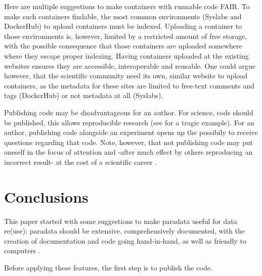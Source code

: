 
Here are multiple suggestions to make containers with runnable code FAIR.
To make such containers findable, the most common 
environments (Syslabs and DockerHub) to upload containers must be indexed.
Uploading a container to those environments is, however, limited by
a restricted amount of free storage, with the possible consequence that
those containers are uploaded somewhere where they escape proper indexing.
Having containers uploaded at the existing websites ensures they are
accessible, interoperable and reusable.
One could argue however, that the scientific community need its own,
similar website to upload containers, as the metadata for these
sites are limited to free-text comments and tags (DockerHub)
or not metadata at all (Syslabs).


Publishing code may be disadvantageous for an author.
For science, code should be published, 
this allows reproducible research 
(see \cite{haibe2020importance} for a tragic example).
For an author, publishing code alongside an experiment opens up
the possibily to receive questions regarding that code.
Note, however, that not publishing code may put 
oneself in the focus of attention
and -after much effect by others reproducing an incorrect result-
at the cost of a scientific career \cite{baggerly2009deriving}.

\section{Conclusions}

This paper started with some suggestions to 
make paradata useful for data re(use):
paradata should be extensive, comprehensively documented,
with the creation of documentation and code going hand-in-hand,
as well as friendly to computers \cite{huvila2022improving}.

Before applying these features, the first step is to publish 
the code. 

